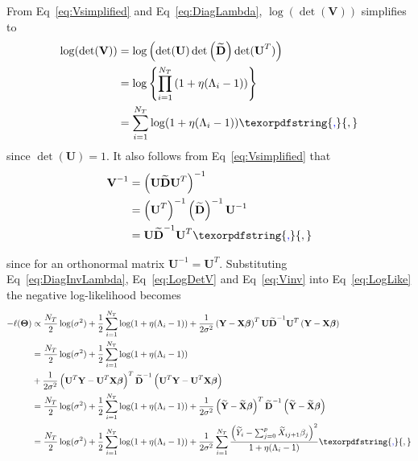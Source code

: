 \documentclass[10pt,letterpaper]{article}
\newcommand{\bX}{\textbf{X}}
\newcommand{\bY}{\textbf{Y}}
\newcommand{\bD}{\textbf{D}}
\newcommand{\bXtilde}{\widetilde{\bX}}
\newcommand{\bYtilde}{\widetilde{\bY}}
\newcommand{\Xtilde}{\widetilde{X}}
\newcommand{\Ytilde}{\widetilde{Y}}
\newcommand{\bU}{\textbf{U}}
\newcommand{\bV}{\textbf{V}}
\newcommand{\bTheta}{\boldsymbol{\Theta}}
\newcommand{\bbeta}{\boldsymbol{\beta}}
\providecommand{\DIFaddtex}[1]{{\protect\color{blue}\uwave{#1}}} %
\providecommand{\DIFaddbegin}{} %
\providecommand{\DIFaddend}{} %
\providecommand{\DIFdelbegin}{} %
\providecommand{\DIFdelend}{} %
\providecommand{\DIFadd}[1]{\texorpdfstring{\DIFaddtex{#1}}{#1}} %
\newcommand{\DIFscaledelfig}{0.5}
\newlength{\DIFdelgraphicswidth} %
\newlength{\DIFdelgraphicsheight} %
\newcommand{\DIFaddincludegraphics}[2][]{{\color{blue}\fbox{\DIFOincludegraphics[#1]{#2}}}} %
\newcommand{\DIFdelincludegraphics}[2][]{%
\sbox{\DIFdelgraphicsbox}{\DIFOincludegraphics[#1]{#2}}%
\settoboxwidth{\DIFdelgraphicswidth}{\DIFdelgraphicsbox} %
\settoboxtotalheight{\DIFdelgraphicsheight}{\DIFdelgraphicsbox} %
\scalebox{\DIFscaledelfig}{%
\parbox[b]{\DIFdelgraphicswidth}{\usebox{\DIFdelgraphicsbox}\\[-\baselineskip] \rule{\DIFdelgraphicswidth}{0em}}\llap{\resizebox{\DIFdelgraphicswidth}{\DIFdelgraphicsheight}{%
\setlength{\unitlength}{\DIFdelgraphicswidth}%
\begin{picture}(1,1)%
\thicklines\linethickness{2pt} %
{\color[rgb]{1,0,0}\put(0,0){\framebox(1,1){}}}%
{\color[rgb]{1,0,0}\put(0,0){\line( 1,1){1}}}%
{\color[rgb]{1,0,0}\put(0,1){\line(1,-1){1}}}%
\end{picture}%
}\hspace*{3pt}}} %
} %
\DeclareRobustCommand{\DIFaddbegin}{\DIFOaddbegin \let\includegraphics\DIFaddincludegraphics} %
\DeclareRobustCommand{\DIFaddend}{\DIFOaddend \let\includegraphics\DIFOincludegraphics} %
\DeclareRobustCommand{\DIFdelbegin}{\DIFOdelbegin \let\includegraphics\DIFdelincludegraphics} %
\DeclareRobustCommand{\DIFdelend}{\DIFOaddend \let\includegraphics\DIFOincludegraphics} %
\begin{document}
From Eq~\ref{eq:Vsimplified} and Eq~\ref{eq:DiagLambda}, $\log(\det(\bV))$ simplifies to
\begin{align}
\log(\det(\bV)) & =  \log  \left(  \det(\bU) \det\left(\widetilde{\bD}\right) \det(\bU^T)\right)   \nonumber \\
& =\log\left\lbrace \prod_{i=1}^{N_T}  \left( 1 + \eta (\Lambda_i-1) \right)  \right\rbrace \nonumber \\
& = \sum_{i=1}^{N_T} \log(1 + \eta (\Lambda_i-1)) \label{eq:LogDetV}\DIFaddbegin \DIFadd{,
}\DIFaddend \end{align}
since $\det(\bU) = 1$. It also follows from Eq~\ref{eq:Vsimplified} that
\begin{align}
\bV^{-1} & = \left( \bU \widetilde{\bD} \bU^T \right)^{-1} \nonumber \\
& = \left( \bU^T \right)^{-1}  \left(\widetilde{\bD}\right)^{-1}    \bU^{-1} \nonumber \\
& = \bU \widetilde{\bD}^{-1} \bU^T \label{eq:Vinv}\DIFaddbegin \DIFadd{,
}\DIFaddend \end{align}
since for an orthonormal matrix $\bU^{-1} = \bU^T$. Substituting Eq~\ref{eq:DiagInvLambda}, Eq~\ref{eq:LogDetV} and Eq~\ref{eq:Vinv} into Eq~\ref{eq:LogLike} the negative log-likelihood becomes
\begin{align}
-\ell(\bTheta) & \propto \frac{N_T}{2}\log(\sigma^2) + \frac{1}{2} \sum_{i=1}^{N_T} \log(1 + \eta (\Lambda_i-1)) + \frac{1}{2\sigma^2} \left(\bY - \bX \bbeta\right)^T \bU \widetilde{\bD}^{-1} \bU^T \left(\bY - \bX \bbeta\right) \DIFdelbegin %
\DIFdelend \DIFaddbegin \nonumber  \DIFaddend \\
& = \frac{N_T}{2}\log(\sigma^2) + \frac{1}{2} \sum_{i=1}^{N_T} \log(1 + \eta (\Lambda_i-1)) \DIFaddbegin \nonumber \\
& \DIFaddend + \frac{1}{2\sigma^2} \left(\bU^T\bY - \bU^T\bX \bbeta\right)^T \widetilde{\bD}^{-1} \left(\bU^T\bY - \bU^T\bX \bbeta\right)  \nonumber\\
& = \frac{N_T}{2}\log(\sigma^2) + \frac{1}{2} \sum_{i=1}^{N_T} \log(1 + \eta (\Lambda_i-1)) + \frac{1}{2\sigma^2} \left(\bYtilde - \bXtilde \bbeta\right)^T \widetilde{\bD}^{-1} \left(\bYtilde - \bXtilde \bbeta\right)  \nonumber\\
& = \frac{N_T}{2}\log(\sigma^2) + \frac{1}{2} \sum_{i=1}^{N_T} \log(1 + \eta (\Lambda_i-1)) + \frac{1}{2\sigma^2} \sum_{i=1}^{N_T}\frac{\left(  \Ytilde_i - \sum_{j=0}^{p}\Xtilde_{ij+1}\beta_j \right) ^2}{1 + \eta (\Lambda_i-1)}  \label{eq:LikeFinal}\DIFaddbegin \DIFadd{,
}\DIFaddend \end{align}
\end{document}
